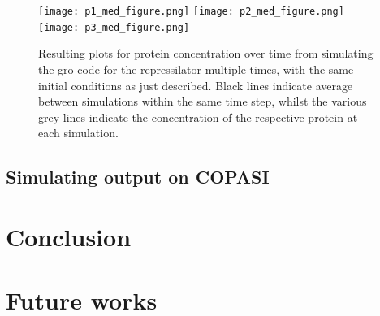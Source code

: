 \documentclass[12pt]{article}
\begin{document}
    
    \begin{figure}[ht]
    \centering
      \texttt{[image: p1\_med\_figure.png]}
    \endminipage\hfill
      \texttt{[image: p2\_med\_figure.png]}
    \endminipage\hfill
      \texttt{[image: p3\_med\_figure.png]}
    \endminipage
    \caption{Resulting plots for protein concentration over time from simulating the gro code for the repressilator multiple times, with the same initial conditions as just described. Black lines indicate average between simulations within the same time step, whilst the various grey lines indicate the concentration of the respective protein at each simulation.}
    \label{fig:tons_of_simulations}
    \end{figure}

\subsection{Simulating output on COPASI}
    \lipsum[1]

\section{Conclusion}
    \lipsum[1]
    
\section{Future works}
    \lipsum[1]



\end{document}
